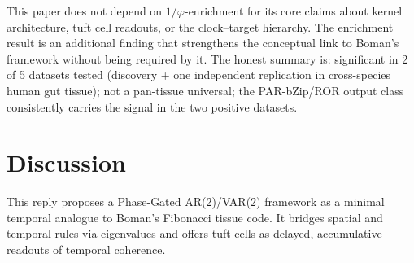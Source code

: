 \documentclass[11pt,letterpaper]{article}
\theoremstyle{definition}
\theoremstyle{remark}
\begin{document}
This paper does not depend on $1/\varphi$-enrichment for its core claims about kernel architecture, tuft cell readouts, or the clock--target hierarchy. The enrichment result is an additional finding that strengthens the conceptual link to Boman's framework without being required by it. The honest summary is: significant in 2 of 5 datasets tested (discovery + one independent replication in cross-species human gut tissue); not a pan-tissue universal; the PAR-bZip/ROR output class consistently carries the signal in the two positive datasets.

\section{Discussion}

This reply proposes a Phase-Gated AR(2)/VAR(2) framework as a minimal temporal analogue to Boman's Fibonacci tissue code. It bridges spatial and temporal rules via eigenvalues and offers tuft cells as delayed, accumulative readouts of temporal coherence.
\end{document}
